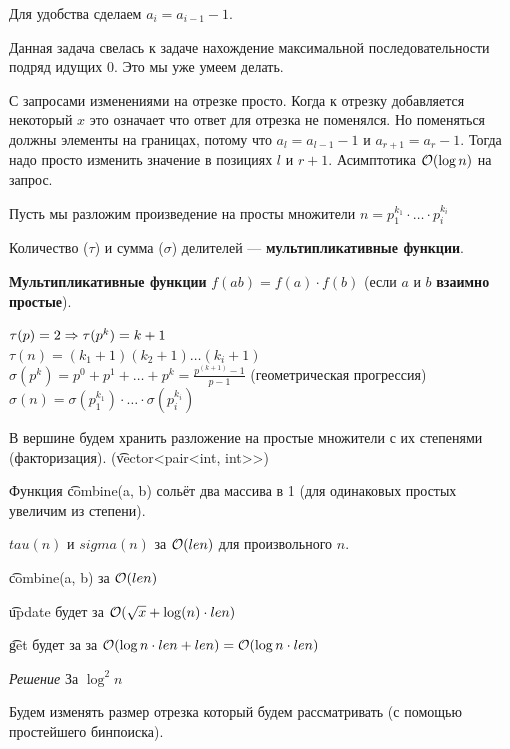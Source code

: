 Для удобства сделаем $a_i = a_{i - 1} - 1$.

Данная задача свелась к задаче нахождение максимальной последовательности подряд идущих 0. Это мы уже умеем делать.

С запросами изменениями на отрезке просто. Когда к отрезку добавляется некоторый $x$ это означает что ответ для отрезка не поменялся. Но поменяться должны элементы на границах, потому что $a_l = a_{l - 1} - 1$ и $a_{r + 1} = a_r - 1$. Тогда надо просто изменить значение в позициях $l$ и $r + 1$. Асимптотика $\mathcal{O}(\log n)$ на запрос.



Пусть мы разложим произведение на просты множители $n = p_1^{k_1} \cdot \ldots \cdot p_i^{k_i}$

Количество ($\tau$) и сумма ($\sigma$) делителей --- {\bf мультипликативные функции}.

{\bf Мультипликативные функции} $f(ab) = f(a) \cdot f(b)$ (если $a$ и $b$ {\bf взаимно простые}). 

$\tau(p) = 2 \Rightarrow \tau(p^k) = k + 1$ \\
$\tau(n) = (k_1+1) (k_2+1) \ldots (k_i+1)$ \\
$\sigma(p ^ k) = p^0 + p^1 + \ldots + p^k = \frac{p^(k + 1) - 1}{p - 1}$ (геометрическая прогрессия) \\
$\sigma(n) = \sigma(p_1^{k_1}) \cdot \ldots \cdot \sigma(p_i^{k_i})$

\down

В вершине будем хранить разложение на простые множители с их степенями (факторизация). (\t{vector<pair<int, int>>})

Функция \t{combine(a, b)} сольёт два массива в 1 (для одинаковых простых увеличим из степени).


$tau(n)$ и $sigma(n)$ за $\mathcal{O}(len)$ для произвольного $n$.

\t{combine(a, b)} за $\mathcal{O}(len)$

\t{update} будет за $\mathcal{O}(\sqrt x + \log(n) \cdot len)$ 

\t{get} будет за за $\mathcal{O}(\log n \cdot len + len) = \mathcal{O}(\log n \cdot len)$




{\it Решение } За $\log^2 n$

Будем изменять размер отрезка который будем рассматривать (с помощью простейшего бинпоиска).

